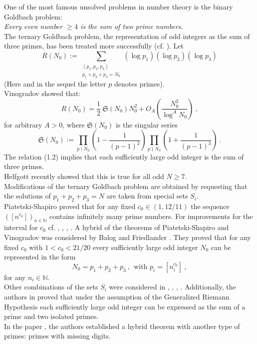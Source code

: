 \documentclass{amsart}
\numberwithin{equation}{subsection}
\begin{document}
One of the most famous unsolved problems in number theory is the binary Goldbach problem:\\
\textit{Every even number $\geq 4$ is the sum of two prime numbers.}\\
The ternary Goldbach problem, the representation of odd integers as the sum of three primes, has been treated more successfully (cf. \cite{rasvino}). Let
\[
R(N_0):=\sum_{\substack{(p_1,p_2,p_3)\\ p_1+p_2+p_3=N_0}} (\log p_1)(\log p_2)(\log p_3) \tag{1.1}
\]
(Here and in the sequel the letter $p$ denotes primes).\\
Vinogradov \cite{vino} showed that:
\[
R(N_0)=\frac{1}{2}\:\mathfrak{S}(N_0)N_0^2+O_A\left(\frac{N_0^2}{\log^A N_0}\right)\:, \tag{1.2}
\]
for arbitrary $A>0$, where  $\mathfrak{S}(N_0)$ is the singular series
\[
\mathfrak{S}(N_0):=\prod_{p\mid N_0}\left(1-\frac{1}{(p-1)^2}\right)\prod_{p\nmid N_0}\left(1+\frac{1}{(p-1)^3}\right)\:. \tag{1.3}
\]
The relation (1.2) implies that each sufficiently large odd integer is the sum of three primes.\\
Helfgott \cite{helfgott} recently showed that this is true for all odd $N\geq 7$. \\
Modifications of the ternary Goldbach problem are obtained by requesting that the solutions of $p_1+p_2+p_3=N$ are taken from special sets $S_i$.\\
Piatetski-Shapiro \cite{Piatetski} proved that for any fixed $c_0\in(1,12/11)$ the sequence $([n^{c_0}])_{n\in\mathbb{N}}$ contains infinitely many prime numbers. For improvements for the interval for $c_0$ cf. \cite{Deshouillers}, \cite{Heath-Brown}, \cite{Kolenski},  \cite{Rivat}. A hybrid of the theorems of Piatetski-Shapiro and Vinogradov was considered by 
Balog and Friedlander \cite{balog}. They proved that for any fixed $c_0$ with $1<c_0<21/20$ every sufficiently large odd integer $N_0$ can be  represented in the form 
$$N_0=p_1+p_2+p_3\:, \ \ \text{with $p_i=[n_i^{c_0}]$}\:,$$
for any $n_i\in\mathbb{N}$.\\
Other combinations of the sets $S_i$ were considered in \cite{balog}, \cite{jia}, \cite{Kumchev}, \cite{Teravainen}. Additionally, the authors in \cite{maier_rassias_vinogradov} proved that under the assumption of the Generalized Riemann Hypothesis each sufficiently large odd integer can be expressed as the sum of a prime and two isolated primes.\\
In the paper \cite{maier-rassias-gold}, the authors established a hybrid theorem with another type of primes: primes with missing digits. 
\end{document}
